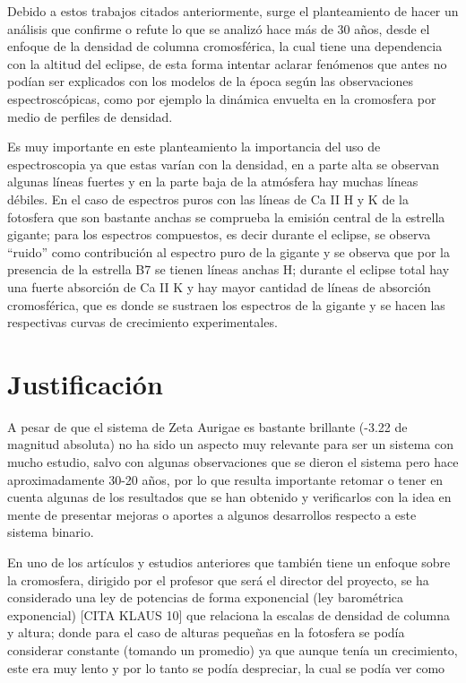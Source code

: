 \documentclass[11pt]{article}
\begin{document}
\noindent Debido a estos trabajos citados anteriormente, surge el planteamiento de hacer un análisis que confirme o refute lo que se analizó hace más de 30 años, desde el enfoque de la densidad de columna cromosférica, la cual tiene una dependencia con la altitud del eclipse, de esta forma intentar aclarar fenómenos que antes no podían ser explicados con los modelos de la época según las observaciones espectroscópicas, como por ejemplo la dinámica envuelta en la cromosfera por medio de perfiles de densidad. 

\noindent Es muy importante en este planteamiento la importancia del uso de espectroscopia ya que estas varían con la densidad, en a parte alta se observan algunas líneas fuertes y en la parte baja de la atmósfera hay muchas líneas débiles. En el caso de espectros puros con las líneas de Ca II H y K  de la fotosfera que son bastante anchas se comprueba la emisión central de la estrella gigante; para los espectros compuestos, es decir durante el eclipse, se observa ``ruido'' como contribución al espectro puro de la gigante y se observa que por la presencia de la estrella B7 se tienen líneas anchas H; durante el eclipse total hay una fuerte absorción de Ca II K y hay mayor cantidad de líneas de absorción cromosférica, que es donde se sustraen los espectros de la gigante y se hacen las respectivas curvas de crecimiento experimentales.




\section{Justificación}

\vspace{3mm}
A pesar de que el sistema de Zeta Aurigae es bastante brillante (-3.22 de magnitud absoluta) no ha sido un aspecto muy relevante para ser un sistema con mucho estudio, salvo con algunas observaciones que se dieron el sistema pero hace aproximadamente 30-20 años, por lo que resulta importante retomar o tener en cuenta algunas de los resultados que se han obtenido y verificarlos con la idea en mente de presentar mejoras o aportes a algunos desarrollos respecto a este sistema binario.

En uno de los artículos y estudios anteriores que también tiene un enfoque sobre la cromosfera, dirigido por el profesor que será el director del proyecto, se ha considerado una ley de potencias de forma exponencial (ley barométrica exponencial) [CITA KLAUS 10] que relaciona la escalas de densidad de columna y altura; donde para el caso de alturas pequeñas en la fotosfera se podía considerar constante (tomando un promedio) ya que aunque tenía un crecimiento, este era muy lento y por lo tanto se podía despreciar, la cual se podía ver como
\end{document}
